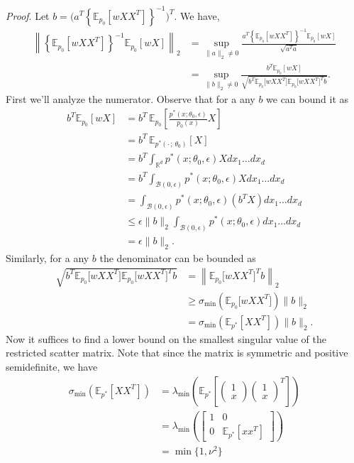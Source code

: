 \documentclass[11pt]{article}
\begin{document}
\noindent \textit{Proof}. Let $b= \Big(a^{T}\left\{\mathbb{E}_{p_{0}}[wXX^{T}]\right\}^{-1}\Big)^{T}$. We have,
\begin{align}
    \left\|\left\{\mathbb{E}_{p_0}[wXX^{T}]\right\}^{-1}\mathbb{E}_{p_0}[wX]\right\|_2 &= \sup_{\|a\|_2\neq 0} \frac{a^{T}\left\{\mathbb{E}_{p_0}[wXX^{T}]\right\}^{-1}\mathbb{E}_{p_0}[wX]}{\sqrt{a^{T}a}} \\
    &= \sup_{\|b\|_2 \neq 0} \frac{b^{T}\mathbb{E}_{p_0}[wX]}{\sqrt{b^{T} \mathbb{E}_{p_0}\big[wXX^{T}\big]\mathbb{E}_{p_0}\big[wXX^{T}\big]^{T}b}}. \label{eq: projection norm}
\end{align}
First we'll analyze the numerator. Observe that for a any $b$ we can bound it as
\begin{align}
    b^{T}\mathbb{E}_{p_{0}}[wX] &= b^{T}\,\mathbb{E}_{ p_{0}}\left[\frac{p^*(x;\theta_0, \epsilon)}{p_{0}(x)}X\right] \\
    &= b^{T}\,\mathbb{E}_{p^*(\cdot\,; \,\theta_0)}\left[X\right] \\
    &= b^{T}\int_{\mathbb{R}^d}p^*(x;\theta_0, \epsilon)X dx_1 \dots dx_d \\
    &= b^{T}\int_{\mathcal{B}(0, \epsilon)}p^*(x;\theta_0, \epsilon)X dx_1 \dots dx_d \\
    &= \int_{\mathcal{B}(0, \epsilon)}p^*(x;\theta_0, \epsilon)(b^{T}X) dx_1 \dots dx_d \\
    &\leq \epsilon \|b\|_2 \int_{\mathcal{B}(0, \epsilon)}p^*(x;\theta_0, \epsilon) dx_1 \dots dx_d \\
    &= \epsilon\|b\|_2. \label{eq: numerator bound}
\end{align}
Similarly, for a any $b$ the denominator can be bounded as
\begin{align}
    \sqrt{b^{T} \mathbb{E}_{p_0}\big[wXX^{T}\big]\mathbb{E}_{p_0}\big[wXX^{T}\big]^{T}b} &= \left\| \mathbb{E}_{p_0}\big[wXX^{T}\big]^{T}b\right\|_2 \\
    &\geq \sigma_{\min}\left(\mathbb{E}_{ p_0}\big[wXX^{T}\big]\right) \|b\|_2 \\
    &= \sigma_{\min}\left(\mathbb{E}_{p^*}\left[XX^{T}\right]\right) \|b\|_2. \label{eq: denominator bound 1}
\end{align}
Now it suffices to find a lower bound on the smallest singular value of the restricted scatter matrix. Note that since the matrix is symmetric and positive semidefinite, we have 
\begin{align*}
    \sigma_{\min}\left(\mathbb{E}_{p^*}\left[XX^{T}\right]\right) &= \lambda_{\min}\left(\mathbb{E}_{p^*}\left[\begin{pmatrix}
        1 \\ x
    \end{pmatrix}
    \begin{pmatrix}
        1 \\ x
    \end{pmatrix}^{T}\right]\right) \\
    &= \lambda_{\min}\left(\begin{bmatrix}
        1 & 0 \\
        0 & \mathbb{E}_{p^*}[xx^T]
    \end{bmatrix}\right) \\
    &= \min\{1, \nu^2\}
\end{align*}
\end{document}
